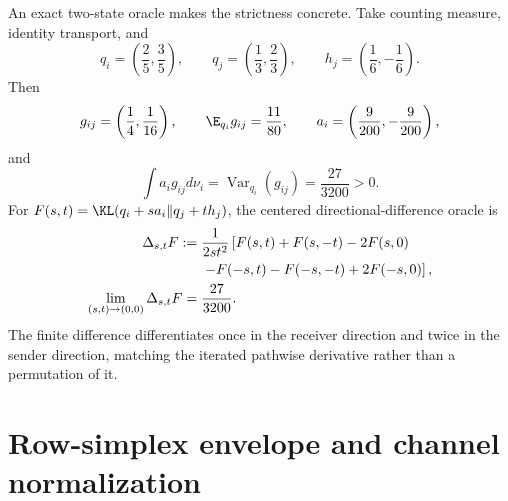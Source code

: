 An exact two-state oracle makes the strictness concrete. Take counting measure, identity transport, and
\begin{equation}
q_i=\left(\frac25,\frac35\right),
\qquad
q_j=\left(\frac13,\frac23\right),
\qquad
h_j=\left(\frac16,-\frac16\right).
\label{eq:appendix-moving-peer-discrete-data}
\end{equation}
Then
\begin{equation}
g_{ij}=\left(\frac14,\frac1{16}\right),
\qquad
\E_{q_i}g_{ij}=\frac{11}{80},
\qquad
a_i=\left(\frac9{200},-\frac9{200}\right),
\label{eq:appendix-moving-peer-discrete-tangent}
\end{equation}
and
\begin{equation}
\int a_i g_{ij}d\nu_i
=\operatorname{Var}_{q_i}(g_{ij})
=\frac{27}{3200}>0.
\label{eq:appendix-moving-peer-discrete-variance}
\end{equation}
For \(F(s,t)=\KL(q_i+s a_i\Vert q_j+t h_j)\), the centered directional-difference oracle is
\begin{align}
\Delta_{s,t}F
:={}&\frac{1}{2st^2}\left[
F(s,t)+F(s,-t)-2F(s,0)
\right.\notag\\
&\left.-F(-s,t)-F(-s,-t)+2F(-s,0)
\right],
\label{eq:appendix-moving-peer-finite-difference}\\
\lim_{(s,t)\to(0,0)}\Delta_{s,t}F
={}&\frac{27}{3200}.
\label{eq:appendix-moving-peer-finite-difference-limit}
\end{align}
The finite difference differentiates once in the receiver direction and twice in the sender direction, matching the iterated pathwise derivative rather than a permutation of it.

\section{Row-simplex envelope and channel normalization}
\label{sec:pifb2-row-envelope-proof}

